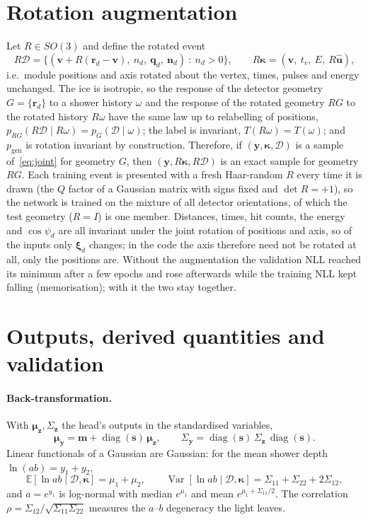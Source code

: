\documentclass[11pt]{article}
\theoremstyle{definition}
\newcommand{\D}{\mathcal{D}}
\newcommand{\y}{\bm{y}}
\newcommand{\E}{\mathbb{E}}
\DeclareMathOperator{\diag}{diag}
\DeclareMathOperator{\Var}{Var}
\begin{document}
\section{Rotation augmentation}

Let $R\in SO(3)$ and define the rotated event
\begin{equation}
  R\D = \big\{(\bm v+R(\bm r_d-\bm v),\ n_d,\ \bm q_d,\ \bm n_d)\ :\ n_d>0\big\},\qquad
  R\bm\kappa = (\bm v,\ t_v,\ E,\ R\hat{\bm u}),
\end{equation}
i.e.\ module positions and axis rotated about the vertex, times, pulses and energy unchanged. The ice is isotropic,
so the response of the detector geometry $G=\{\bm r_d\}$ to a shower history $\omega$ and the response of the rotated
geometry $RG$ to the rotated history $R\omega$ have the same law up to relabelling of positions,
$p_{RG}(R\D\mid R\omega)=p_G(\D\mid\omega)$; the label is invariant, $T(R\omega)=T(\omega)$; and $p_{\mathrm{gen}}$
is rotation invariant by construction. Therefore, if $(\y,\bm\kappa,\D)$ is a sample of~\eqref{eq:joint} for
geometry $G$, then $(\y,R\bm\kappa,R\D)$ is an exact sample for geometry $RG$. Each training event is presented with a
fresh Haar-random $R$ every time it is drawn (the $Q$ factor of a Gaussian matrix with signs fixed and $\det R=+1$),
so the network is trained on the mixture of all detector orientations, of which the test geometry ($R=I$) is one
member. Distances, times, hit counts, the energy and $\cos\psi_d$ are all invariant under the joint rotation of
positions and axis, so of the inputs only $\bm\xi_d$ changes; in the code the axis therefore need not be rotated at
all, only the positions are. Without the augmentation the validation NLL reached its minimum after a few epochs
and rose afterwards while the training NLL kept falling (memorisation); with it the two stay together.

\section{Outputs, derived quantities and validation}

\paragraph{Back-transformation.}
With $\bm\mu_{\bm z},\Sigma_{\bm z}$ the head's outputs in the standardised variables,
\begin{equation}
  \bm\mu_{\y} = \bm m + \diag(\bm s)\,\bm\mu_{\bm z},\qquad \Sigma_{\y} = \diag(\bm s)\,\Sigma_{\bm z}\,\diag(\bm s) .
\end{equation}
Linear functionals of a Gaussian are Gaussian: for the mean shower depth $\ln(ab) = y_1+y_2$,
\begin{equation}
  \E[\ln ab\mid\D,\bm\kappa] = \mu_1+\mu_2,\qquad \Var[\ln ab\mid\D,\bm\kappa] = \Sigma_{11}+\Sigma_{22}+2\Sigma_{12},
\end{equation}
and $a=e^{y_1}$ is log-normal with median $e^{\mu_1}$ and mean $e^{\mu_1+\Sigma_{11}/2}$. The correlation
$\rho=\Sigma_{12}/\sqrt{\Sigma_{11}\Sigma_{22}}$ measures the $a$--$b$ degeneracy the light leaves.
\end{document}
